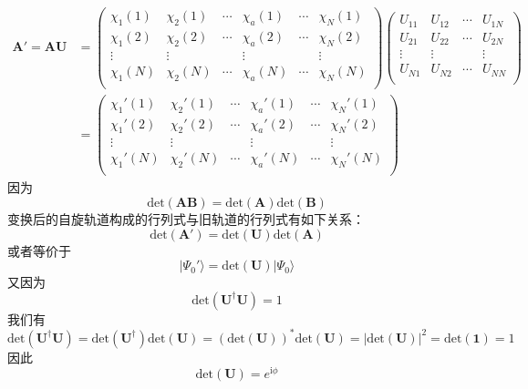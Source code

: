 \documentclass[]{article}
\begin{document}
\begin{align}
	\mathbf{A'}=\mathbf{AU}
	&=
	\begin{pmatrix}
		\chi_1(1)&\chi_2(1)&\cdots&\chi_a(1)&\cdots&\chi_N(1)\\
		\chi_1(2)&\chi_2(2)&\cdots&\chi_a(2)&\cdots&\chi_N(2)\\
		\vdots	 &\vdots   &	  &\vdots   &      &\vdots\\
		\chi_1(N)&\chi_2(N)&\cdots&\chi_a(N)&\cdots&\chi_N(N)\\
	\end{pmatrix}
	\begin{pmatrix}
		U_{11}&U_{12}&\cdots&U_{1N}\\
		U_{21}&U_{22}&\cdots&U_{2N}\\
		\vdots&\vdots&	    &\vdots\\
		U_{N1}&U_{N2}&\cdots&U_{NN}\\
	\end{pmatrix}\nonumber\\
	&=
	\begin{pmatrix}
		\chi_1'(1)&\chi_2'(1)&\cdots&\chi_a'(1)&\cdots&\chi_N'(1)\\
		\chi_1'(2)&\chi_2'(2)&\cdots&\chi_a'(2)&\cdots&\chi_N'(2)\\
		\vdots	 &\vdots   &	  &\vdots   &      &\vdots\\
		\chi_1'(N)&\chi_2'(N)&\cdots&\chi_a'(N)&\cdots&\chi_N'(N)\\
	\end{pmatrix}
\end{align}
因为
\begin{equation}
	\mathrm{det}(\mathbf{AB})=\mathrm{det}(\mathbf{A})\mathrm{det}(\mathbf{B})
\end{equation}
变换后的自旋轨道构成的行列式与旧轨道的行列式有如下关系：
\begin{equation}
	\mathrm{det}(\mathbf{A'})=\mathrm{det}(\mathbf{U})\mathrm{det}(\mathbf{A})
\end{equation}
或者等价于
\begin{equation}
	|\Psi_0'\rangle=\mathrm{det}(\mathbf{U})|\Psi_0\rangle
\end{equation}
又因为
\begin{equation}
	\mathrm{det}(\mathbf{U^{\dagger}U})=1
\end{equation}
我们有
\begin{equation}
	\mathrm{det}(\mathbf{U^{\dagger}U})=\mathrm{det}(\mathbf{U^{\dagger}})\mathrm{det}(\mathbf{U})=(\mathrm{det}(\mathbf{U}))^*\mathrm{det}(\mathbf{U})=|\mathrm{det}(\mathbf{U})|^2=\mathrm{det}(\mathbf{1})=1
\end{equation}
因此
\begin{equation}
	\mathrm{det}(\mathbf{U})=e^{\mathrm{i}\phi}
\end{equation}
\end{document}
